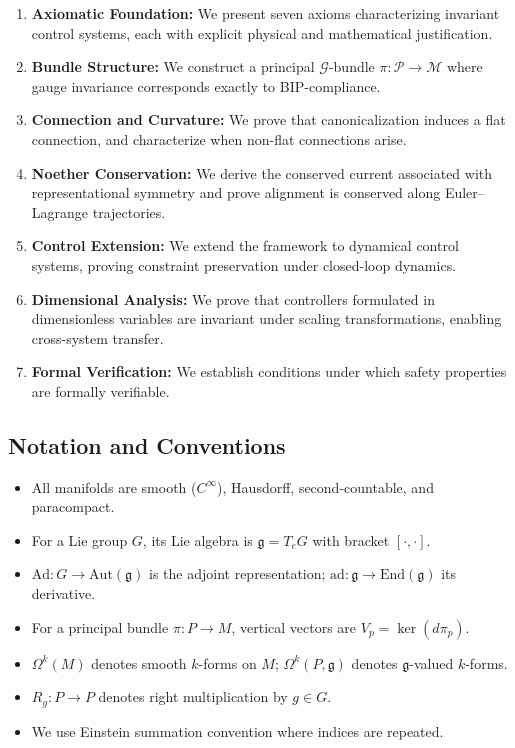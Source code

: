 \documentclass[11pt]{article}
\begin{document}
\begin{enumerate}
    \item \textbf{Axiomatic Foundation:} We present seven axioms characterizing invariant control systems, each with explicit physical and mathematical justification.

    \item \textbf{Bundle Structure:} We construct a principal $\mathcal{G}$-bundle $\pi : \mathcal{P} \to \mathcal{M}$ where gauge invariance corresponds exactly to BIP-compliance.

    \item \textbf{Connection and Curvature:} We prove that canonicalization induces a flat connection, and characterize when non-flat connections arise.

    \item \textbf{Noether Conservation:} We derive the conserved current associated with representational symmetry and prove alignment is conserved along Euler--Lagrange trajectories.

    \item \textbf{Control Extension:} We extend the framework to dynamical control systems, proving constraint preservation under closed-loop dynamics.

    \item \textbf{Dimensional Analysis:} We prove that controllers formulated in dimensionless variables are invariant under scaling transformations, enabling cross-system transfer.

    \item \textbf{Formal Verification:} We establish conditions under which safety properties are formally verifiable.
\end{enumerate}

\subsection{Notation and Conventions}

\begin{itemize}
    \item All manifolds are smooth ($C^\infty$), Hausdorff, second-countable, and paracompact.
    \item For a Lie group $G$, its Lie algebra is $\mathfrak{g} = T_e G$ with bracket $[\cdot, \cdot]$.
    \item $\mathrm{Ad} : G \to \mathrm{Aut}(\mathfrak{g})$ is the adjoint representation; $\mathrm{ad} : \mathfrak{g} \to \mathrm{End}(\mathfrak{g})$ its derivative.
    \item For a principal bundle $\pi : P \to M$, vertical vectors are $V_p = \ker(d\pi_p)$.
    \item $\Omega^k(M)$ denotes smooth $k$-forms on $M$; $\Omega^k(P, \mathfrak{g})$ denotes $\mathfrak{g}$-valued $k$-forms.
    \item $R_g : P \to P$ denotes right multiplication by $g \in G$.
    \item We use Einstein summation convention where indices are repeated.
\end{itemize}
\end{document}
